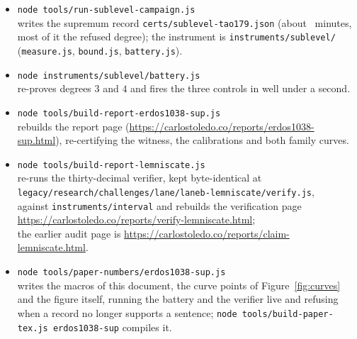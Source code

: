 \documentclass[11pt]{article}
\begin{document}
\begin{itemize}
\item \texttt{node tools/run-sublevel-campaign.js}\\
writes the supremum record \texttt{certs/sublevel-tao179.json} (about \RecMinutes\ minutes, most
of it the refused degree); the instrument is \texttt{instruments/sublevel/} (\texttt{measure.js},
\texttt{bound.js}, \texttt{battery.js}).
\item \texttt{node instruments/sublevel/battery.js}\\
re-proves degrees $3$ and $4$ and fires the three controls in well under a second.
\item \texttt{node tools/build-report-erdos1038-sup.js}\\
rebuilds the report page (\url{https://carlostoledo.co/reports/erdos1038-sup.html}),
re-certifying the witness, the calibrations and both family curves.
\item \texttt{node tools/build-report-lemniscate.js}\\
re-runs the thirty-decimal verifier, kept byte-identical at\\
\texttt{legacy/research/challenges/lane/laneb-lemniscate/verify.js},\\
against \texttt{instruments/interval} and rebuilds the verification page\\
\url{https://carlostoledo.co/reports/verify-lemniscate.html};\\
the earlier audit page is \url{https://carlostoledo.co/reports/claim-lemniscate.html}.
\item \texttt{node tools/paper-numbers/erdos1038-sup.js}\\
writes the macros of this document, the curve points of Figure~\ref{fig:curves} and the figure
itself, running the battery and the verifier live and refusing when a record no longer supports
a sentence; \texttt{node tools/build-paper-tex.js erdos1038-sup} compiles it.
\end{itemize}
\end{document}
